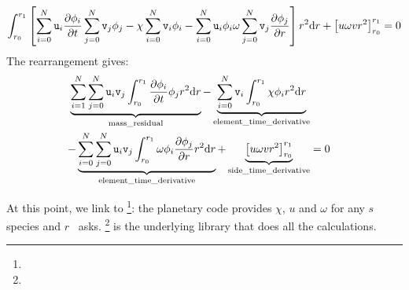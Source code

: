 \begin{equation}
 \int_{r_0}^{r_1}\left[
                  \sum_{i=0}^{N}\mathtt{u}_i\frac{\partial\phi_i}{\partial t} \sum_{j=0}^{N}\mathtt{v}_j \phi_j
                 - \chi \sum_{i=0}^{N}\mathtt{v}_i\phi_i 
                 - \sum_{i=0}^{N}\mathtt{u}_i\phi_i\omega\sum_{j=0}^{N}\mathtt{v}_j\frac{\partial\phi_j}{\partial r}\right]r^2\mathrm{d} r
 + \left[u\omega v r^2\right]_{r_0}^{r_1} = 0
\end{equation}
The rearrangement gives:
\begin{equation}
\begin{split}
  \underbrace{\sum_{i=1}^{N}\sum_{j=0}^{N}\mathtt{u}_i\mathtt{v}_j\int_{r_0}^{r_1}\frac{\partial\phi_i}{\partial t}\phi_jr^2\mathrm{d} r}_\text{mass\_residual}
- \underbrace{\sum_{i=0}^{N}\mathtt{v}_i\int_{r_0}^{r_1}\chi\phi_i r^2\mathrm{d} r}_\text{element\_time\_derivative} \\
- \underbrace{\sum_{i=0}^{N}\sum_{j=0}^{N}\mathtt{u}_i\mathtt{v}_j\int_{r_0}^{r_1}\omega\phi_i\frac{\partial\phi_j}{\partial r}r^2\mathrm{d} r}_\text{element\_time\_derivative}
+ \underbrace{\left[u\omega v r^2\right]_{r_0}^{r_1}}_\text{side\_time\_derivative}  & = 0
\end{split}
\end{equation}


At this point, we link to \GRINS\footnote{\GitGrins}: the planetary code provides $\chi$, $u$ and
$\omega$ for any $s$ species and $r$ \GRINS\ asks. \LibMesh\footnote{\GitLibmesh} is the underlying library that
does all the calculations.
